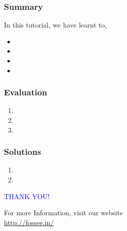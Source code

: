 \documentclass[12pt,compress]{beamer}
\begin{document}
\begin{frame}
\frametitle{Summary}
\label{sec-18}

  In this tutorial, we have learnt to,


\begin{itemize}
\item 
\item 
\item 
\item 
\end{itemize}
\end{frame}
\begin{frame}[fragile]
\frametitle{Evaluation}
\label{sec-19}


\begin{enumerate}
\item 
\item 
\item 
\end{enumerate}
\end{frame}
\begin{frame}
\frametitle{Solutions}
\label{sec-20}


\begin{enumerate}
\item 
\vspace{15pt}
\item 
\end{enumerate}
\end{frame}
\begin{frame}


\begin{block}{}
  \begin{center}
  \textcolor{blue}{\Large THANK YOU!} 
  \end{center}
  \end{block}
\begin{block}{}
  \begin{center}
    For more Information, visit our website\\
    \url{http://fossee.in/}
  \end{center}  
  \end{block}
\end{frame}
\end{document}
